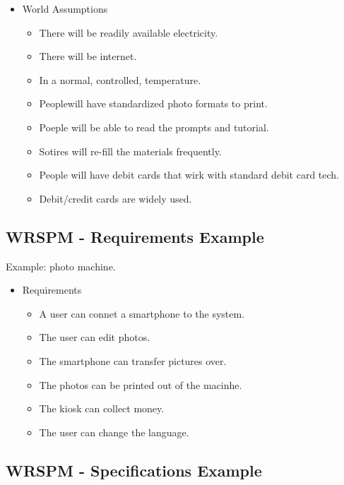         \begin{itemize}
            \item World Assumptions
            \begin{itemize}
                \item There will be readily available electricity.
                \item There will be internet.
                \item In a normal, controlled, temperature.
                \item Peoplewill have standardized photo formats to print.
                \item Poeple will be able to read the prompts and tutorial.
                \item Sotires will re-fill the materials frequently.
                \item People will have debit cards that wirk with standard debit card tech.
                \item Debit/credit cards are widely used.
            \end{itemize}
        \end{itemize}

    \subsection{WRSPM - Requirements Example}

        Example: photo machine.

        \begin{itemize}
            \item Requirements
            \begin{itemize}
                \item A user can connet a smartphone to the system.
                \item The user can edit photos.
                \item The smartphone can transfer pictures over.
                \item The photos can be printed out of the macinhe.
                \item The kiosk can collect money.
                \item The user can change the language.
            \end{itemize}
        \end{itemize}

    \subsection{WRSPM - Specifications Example}

